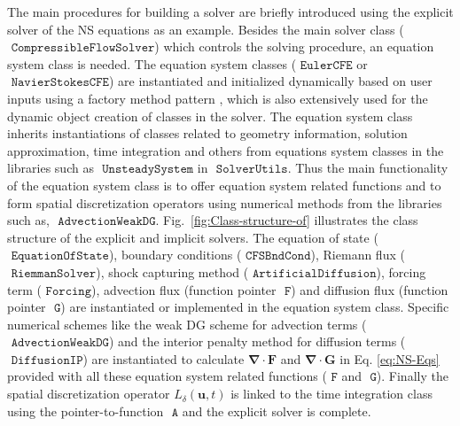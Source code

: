   The main procedures for building a solver are briefly introduced using
  the explicit solver of the NS equations as an example. Besides the main
  solver class ($\texttt{ CompressibleFlowSolver}$) which controls the
  solving procedure, an equation system class is needed. The
  equation system classes ($\texttt{ EulerCFE}$ or $\texttt{ NavierStokesCFE}$)
  are instantiated and initialized dynamically based on user inputs using
  a factory method pattern \cite{Cantwell2015}, which is also extensively
  used for the dynamic object creation of classes in the solver. The equation
  system class inherits instantiations of classes related to geometry
  information, solution approximation, time integration and others from
  equations system classes in the libraries such as $\texttt{ UnsteadySystem}$
  in $\texttt{ SolverUtils}$. Thus the main functionality of the equation system class
  is to offer equation system related functions and to form spatial
  discretization operators using numerical methods from the libraries
  such as, $\texttt{ AdvectionWeakDG}$. Fig.~\ref{fig:Class-structure-of}
  illustrates the class structure of the explicit and implicit solvers.
  The equation of state ($\texttt{ EquationOfState}$), boundary conditions
  ($\texttt{ CFSBndCond}$), Riemann flux ($\texttt{ RiemmanSolver}$), shock
  capturing method ($\texttt{ ArtificialDiffusion}$), forcing term ($\texttt{ Forcing}$),
  advection flux (function pointer $\texttt{ F}$) and diffusion flux (function
  pointer $\texttt{ G}$) are instantiated or implemented in the equation system class.
  Specific numerical schemes like the weak
  DG scheme for advection terms ($\texttt{ AdvectionWeakDG}$) and the interior
  penalty method for diffusion terms ($\texttt{ DiffusionIP}$) are instantiated
  to calculate $\mathbf{\nabla}\cdot\mathbf{F}$
  and $\mathbf{\nabla}\cdot\mathbf{G}$ in Eq. \eqref{eq:NS-Eqs}
  provided with all these equation system related functions ($\texttt{ F}$ and $\texttt{ G}$). Finally
  the spatial discretization operator $\textit{L}_{\delta}\left(\mathbf{u},t\right)$
  is linked to the time integration class using the pointer-to-function
  $\texttt{ A}$ and the explicit solver is complete.

